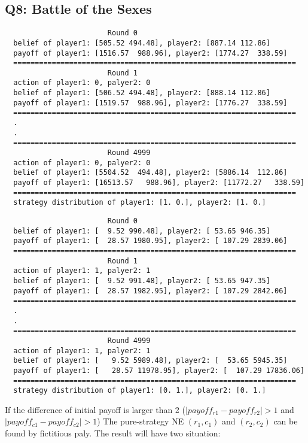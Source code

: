 \documentclass[a4paper, oneside, final, 12pt]{scrartcl} %
\begin{document}
\newpage

\subsection{Q8: Battle of the Sexes}

\begin{lstlisting}
                        Round 0
  belief of player1: [505.52 494.48], player2: [887.14 112.86]
  payoff of player1: [1516.57  988.96], player2: [1774.27  338.59]
  ==================================================================
                        Round 1
  action of player1: 0, palyer2: 0
  belief of player1: [506.52 494.48], player2: [888.14 112.86]
  payoff of player1: [1519.57  988.96], player2: [1776.27  338.59]
  ==================================================================
  .
  .
  ==================================================================
                        Round 4999
  action of player1: 0, palyer2: 0
  belief of player1: [5504.52  494.48], player2: [5886.14  112.86]
  payoff of player1: [16513.57   988.96], player2: [11772.27   338.59]
  ==================================================================
  strategy distribution of player1: [1. 0.], player2: [1. 0.]
\end{lstlisting}

\begin{lstlisting}
                        Round 0
  belief of player1: [  9.52 990.48], player2: [ 53.65 946.35]
  payoff of player1: [  28.57 1980.95], player2: [ 107.29 2839.06]
  ==================================================================
                        Round 1
  action of player1: 1, palyer2: 1
  belief of player1: [  9.52 991.48], player2: [ 53.65 947.35]
  payoff of player1: [  28.57 1982.95], player2: [ 107.29 2842.06]
  ==================================================================
  .
  .
  ==================================================================
                        Round 4999
  action of player1: 1, palyer2: 1
  belief of player1: [   9.52 5989.48], player2: [  53.65 5945.35]
  payoff of player1: [   28.57 11978.95], player2: [  107.29 17836.06]
  ==================================================================
  strategy distribution of player1: [0. 1.], player2: [0. 1.]
\end{lstlisting}

\begingroup
\raggedright
If the difference of initial payoff is larger than 2
($|payoff_{r1} - payoff_{r2}| > 1$ and $|payoff_{c1} - payoff_{c2}| > 1$)
The pure-strategy NE $(r_1, c_1)$ and $(r_2, c_2)$ can be found by fictitious paly.
The result will have two situation:
\end{document}
